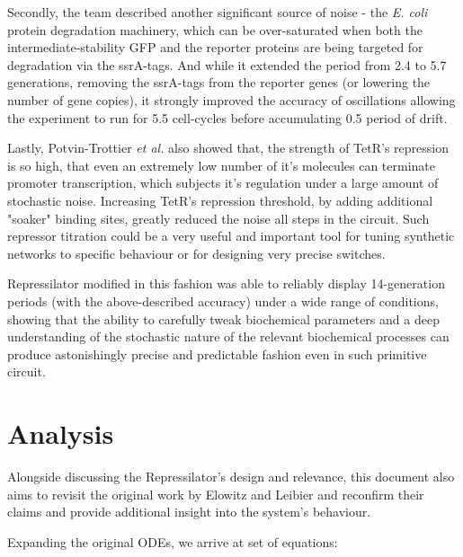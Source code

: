 \documentclass[runningheads,a4paper]{llncs}
\begin{document}
Secondly, the team described another significant source of noise - the \textit{E. coli} protein degradation machinery, which can be over-saturated when both the intermediate-stability GFP and the reporter proteins are being targeted for degradation via the ssrA-tags\cite{Potvin-Trottier2016a}. And while it extended the period from 2.4 to 5.7 generations, removing the ssrA-tags from the reporter genes (or lowering the number of gene copies), it strongly improved the accuracy of oscillations allowing the experiment to run for 5.5 cell-cycles before accumulating 0.5 period of drift\cite{Potvin-Trottier2016a}.

Lastly, Potvin-Trottier \textit{et al.} also showed that, the strength of TetR's repression is so high, that even an extremely low number of it's molecules can terminate promoter transcription, which subjects it's regulation under a large amount of stochastic noise. Increasing TetR's repression threshold, by adding additional "soaker" binding sites, greatly reduced the noise all steps in the circuit\cite{Potvin-Trottier2016a}. Such repressor titration could be a very useful and important tool for tuning synthetic networks to specific behaviour or for designing very precise switches.

Repressilator modified in this fashion was able to reliably display 14-generation periods (with the above-described accuracy) under a wide range of conditions, showing that the ability to carefully tweak biochemical parameters and a deep understanding of the stochastic nature of the relevant biochemical processes can produce astonishingly precise and predictable fashion even in such primitive circuit\cite{Potvin-Trottier2016a}.

\section*{Analysis}
Alongside discussing the Repressilator's design and relevance, this document also aims to revisit the original work by Elowitz and Leibier\cite{Elowitz2000d} and reconfirm their claims and provide additional insight into the system's behaviour.

Expanding the original ODEs, we arrive at set of equations:
\end{document}

